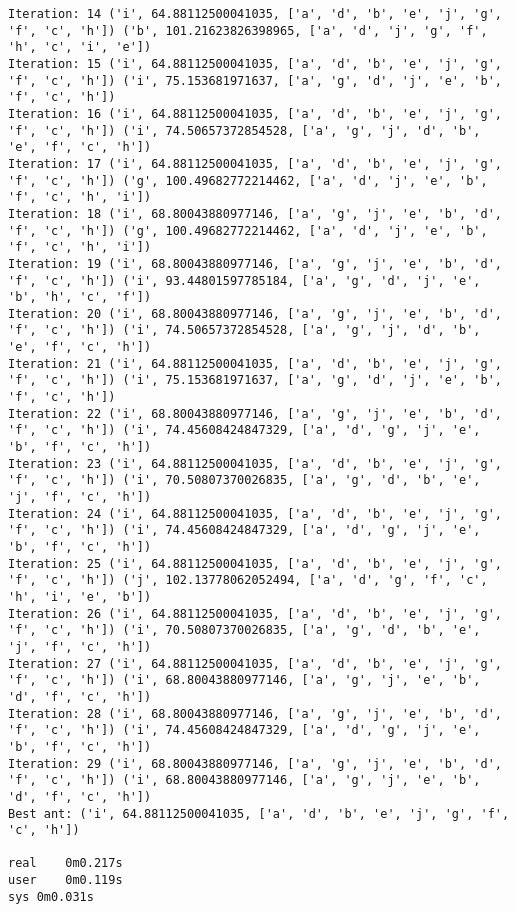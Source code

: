 \documentclass[english,man]{apa6}
\begin{document}
\begin{verbatim}
Iteration: 14 ('i', 64.88112500041035, ['a', 'd', 'b', 'e', 'j', 'g', 'f', 'c', 'h']) ('b', 101.21623826398965, ['a', 'd', 'j', 'g', 'f', 'h', 'c', 'i', 'e'])
Iteration: 15 ('i', 64.88112500041035, ['a', 'd', 'b', 'e', 'j', 'g', 'f', 'c', 'h']) ('i', 75.153681971637, ['a', 'g', 'd', 'j', 'e', 'b', 'f', 'c', 'h'])
Iteration: 16 ('i', 64.88112500041035, ['a', 'd', 'b', 'e', 'j', 'g', 'f', 'c', 'h']) ('i', 74.50657372854528, ['a', 'g', 'j', 'd', 'b', 'e', 'f', 'c', 'h'])
Iteration: 17 ('i', 64.88112500041035, ['a', 'd', 'b', 'e', 'j', 'g', 'f', 'c', 'h']) ('g', 100.49682772214462, ['a', 'd', 'j', 'e', 'b', 'f', 'c', 'h', 'i'])
Iteration: 18 ('i', 68.80043880977146, ['a', 'g', 'j', 'e', 'b', 'd', 'f', 'c', 'h']) ('g', 100.49682772214462, ['a', 'd', 'j', 'e', 'b', 'f', 'c', 'h', 'i'])
Iteration: 19 ('i', 68.80043880977146, ['a', 'g', 'j', 'e', 'b', 'd', 'f', 'c', 'h']) ('i', 93.44801597785184, ['a', 'g', 'd', 'j', 'e', 'b', 'h', 'c', 'f'])
Iteration: 20 ('i', 68.80043880977146, ['a', 'g', 'j', 'e', 'b', 'd', 'f', 'c', 'h']) ('i', 74.50657372854528, ['a', 'g', 'j', 'd', 'b', 'e', 'f', 'c', 'h'])
Iteration: 21 ('i', 64.88112500041035, ['a', 'd', 'b', 'e', 'j', 'g', 'f', 'c', 'h']) ('i', 75.153681971637, ['a', 'g', 'd', 'j', 'e', 'b', 'f', 'c', 'h'])
Iteration: 22 ('i', 68.80043880977146, ['a', 'g', 'j', 'e', 'b', 'd', 'f', 'c', 'h']) ('i', 74.45608424847329, ['a', 'd', 'g', 'j', 'e', 'b', 'f', 'c', 'h'])
Iteration: 23 ('i', 64.88112500041035, ['a', 'd', 'b', 'e', 'j', 'g', 'f', 'c', 'h']) ('i', 70.50807370026835, ['a', 'g', 'd', 'b', 'e', 'j', 'f', 'c', 'h'])
Iteration: 24 ('i', 64.88112500041035, ['a', 'd', 'b', 'e', 'j', 'g', 'f', 'c', 'h']) ('i', 74.45608424847329, ['a', 'd', 'g', 'j', 'e', 'b', 'f', 'c', 'h'])
Iteration: 25 ('i', 64.88112500041035, ['a', 'd', 'b', 'e', 'j', 'g', 'f', 'c', 'h']) ('j', 102.13778062052494, ['a', 'd', 'g', 'f', 'c', 'h', 'i', 'e', 'b'])
Iteration: 26 ('i', 64.88112500041035, ['a', 'd', 'b', 'e', 'j', 'g', 'f', 'c', 'h']) ('i', 70.50807370026835, ['a', 'g', 'd', 'b', 'e', 'j', 'f', 'c', 'h'])
Iteration: 27 ('i', 64.88112500041035, ['a', 'd', 'b', 'e', 'j', 'g', 'f', 'c', 'h']) ('i', 68.80043880977146, ['a', 'g', 'j', 'e', 'b', 'd', 'f', 'c', 'h'])
Iteration: 28 ('i', 68.80043880977146, ['a', 'g', 'j', 'e', 'b', 'd', 'f', 'c', 'h']) ('i', 74.45608424847329, ['a', 'd', 'g', 'j', 'e', 'b', 'f', 'c', 'h'])
Iteration: 29 ('i', 68.80043880977146, ['a', 'g', 'j', 'e', 'b', 'd', 'f', 'c', 'h']) ('i', 68.80043880977146, ['a', 'g', 'j', 'e', 'b', 'd', 'f', 'c', 'h'])
Best ant: ('i', 64.88112500041035, ['a', 'd', 'b', 'e', 'j', 'g', 'f', 'c', 'h'])

real    0m0.217s
user    0m0.119s
sys 0m0.031s
\end{verbatim}
\end{document}
